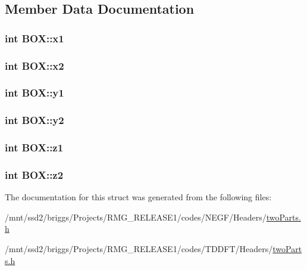\subsection{Member Data Documentation}
\hypertarget{struct_b_o_x_a01dbc6cf725f1f35c7b2da3714be723a}{
\subsubsection[{x1}]{\setlength{\rightskip}{0pt plus 5cm}int B\-O\-X\-::x1}}\label{struct_b_o_x_a01dbc6cf725f1f35c7b2da3714be723a}
\hypertarget{struct_b_o_x_a4e0c431804e85d22cd0f91fffd031ea0}{
\subsubsection[{x2}]{\setlength{\rightskip}{0pt plus 5cm}int B\-O\-X\-::x2}}\label{struct_b_o_x_a4e0c431804e85d22cd0f91fffd031ea0}
\hypertarget{struct_b_o_x_a6408359fd2079e1c94289068813238b1}{
\subsubsection[{y1}]{\setlength{\rightskip}{0pt plus 5cm}int B\-O\-X\-::y1}}\label{struct_b_o_x_a6408359fd2079e1c94289068813238b1}
\hypertarget{struct_b_o_x_a6c454889006e69e5f98cff2b7a5b0d3c}{
\subsubsection[{y2}]{\setlength{\rightskip}{0pt plus 5cm}int B\-O\-X\-::y2}}\label{struct_b_o_x_a6c454889006e69e5f98cff2b7a5b0d3c}
\hypertarget{struct_b_o_x_a203700d98ec1eb1304cda1333b3dc418}{
\subsubsection[{z1}]{\setlength{\rightskip}{0pt plus 5cm}int B\-O\-X\-::z1}}\label{struct_b_o_x_a203700d98ec1eb1304cda1333b3dc418}
\hypertarget{struct_b_o_x_ac0a1182e03729bdd1ca85e86697a0df3}{
\subsubsection[{z2}]{\setlength{\rightskip}{0pt plus 5cm}int B\-O\-X\-::z2}}\label{struct_b_o_x_ac0a1182e03729bdd1ca85e86697a0df3}


The documentation for this struct was generated from the following files\-:\begin{DoxyCompactItemize}
\item 
/mnt/ssd2/briggs/\-Projects/\-R\-M\-G\-\_\-\-R\-E\-L\-E\-A\-S\-E1/codes/\-N\-E\-G\-F/\-Headers/\hyperlink{_n_e_g_f_2_headers_2two_parts_8h}{two\-Parts.\-h}\item 
/mnt/ssd2/briggs/\-Projects/\-R\-M\-G\-\_\-\-R\-E\-L\-E\-A\-S\-E1/codes/\-T\-D\-D\-F\-T/\-Headers/\hyperlink{_t_d_d_f_t_2_headers_2two_parts_8h}{two\-Parts.\-h}\end{DoxyCompactItemize}
